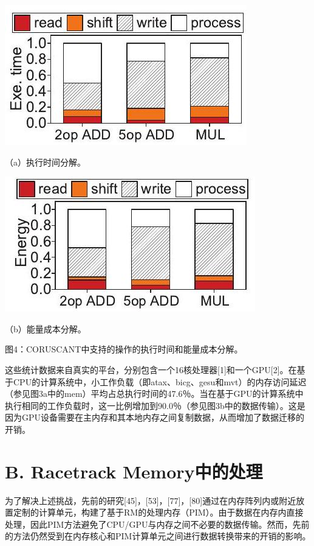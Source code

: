 \documentclass[10pt]{article}
\begin{document}
\begin{center}
\includegraphics[max width=\textwidth]{2024_05_12_abeba8a85da5b5ec4c7bg-03(2)}
\end{center}

（a）执行时间分解。

\begin{center}
\includegraphics[max width=\textwidth]{2024_05_12_abeba8a85da5b5ec4c7bg-03}
\end{center}

（b）能量成本分解。

图4：CORUSCANT中支持的操作的执行时间和能量成本分解。

这些统计数据来自真实的平台，分别包含一个16核处理器[1]和一个GPU[2]。在基于CPU的计算系统中，小工作负载（即atax、bicg、gesu和mvt）的内存访问延迟（参见图3a中的mem）平均占总执行时间的47.6％。当在基于GPU的计算系统中执行相同的工作负载时，这一比例增加到90.0％（参见图3b中的数据传输）。这是因为GPU设备需要在主内存和其本地内存之间复制数据，从而增加了数据迁移的开销。

\section*{B. Racetrack Memory中的处理}
为了解决上述挑战，先前的研究[45]，[53]，[77]，[80]通过在内存阵列内或附近放置定制的计算单元，构建了基于RM的处理内存（PIM）。由于数据在内存内直接处理，因此PIM方法避免了CPU/GPU与内存之间不必要的数据传输。然而，先前的方法仍然受到在内存核心和PIM计算单元之间进行数据转换带来的开销的影响。
\end{document}
